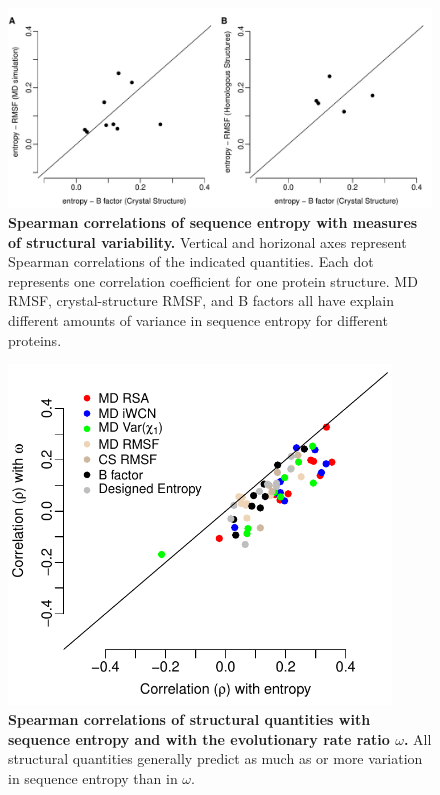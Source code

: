 \documentclass[12pt]{article}
\begin{document}
\begin{figure}[tbh]
\begin{center}
    \includegraphics[width=6.5in]{cor_entropy_bfca_rmsf.pdf}
\end{center}
\caption{\textbf{Spearman correlations of sequence entropy with measures of structural variability.}
Vertical and horizonal axes represent Spearman correlations of the indicated quantities. Each dot represents one correlation coefficient for one protein structure. MD RMSF, crystal-structure RMSF, and B factors all have explain different amounts of variance in sequence entropy for different proteins.}
\label{fig:cor_entropy_bfca_rmsf}
\end{figure}

\begin{figure}[tbh]
\begin{center}
    \includegraphics[width=4in]{cor_entropy_omega.pdf}
\end{center}
\caption{\textbf{Spearman correlations of structural quantities with sequence entropy and with the evolutionary rate ratio $\omega$.} All structural quantities generally predict as much as or more variation in sequence entropy than in $\omega$.}
\label{fig:cor_entropy_omega}
\end{figure}
\end{document}
